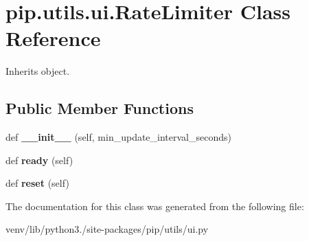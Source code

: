 \hypertarget{classpip_1_1utils_1_1ui_1_1_rate_limiter}{}\section{pip.\+utils.\+ui.\+Rate\+Limiter Class Reference}
\label{classpip_1_1utils_1_1ui_1_1_rate_limiter}


Inherits object.

\subsection*{Public Member Functions}
\begin{DoxyCompactItemize}
\item 
\mbox{\label{classpip_1_1utils_1_1ui_1_1_rate_limiter_a35748860ab92a9a2fb84efead234f1c4}} 
def {\bfseries \+\_\+\+\_\+init\+\_\+\+\_\+} (self, min\+\_\+update\+\_\+interval\+\_\+seconds)
\item 
\mbox{\label{classpip_1_1utils_1_1ui_1_1_rate_limiter_afd2f4faf3a50b986a4b4548093098461}} 
def {\bfseries ready} (self)
\item 
\mbox{\label{classpip_1_1utils_1_1ui_1_1_rate_limiter_aa7ccc226444ca10d3988d265521e2684}} 
def {\bfseries reset} (self)
\end{DoxyCompactItemize}


The documentation for this class was generated from the following file\+:\begin{DoxyCompactItemize}
\item 
venv/lib/python3./site-\/packages/pip/utils/ui.\+py\end{DoxyCompactItemize}
